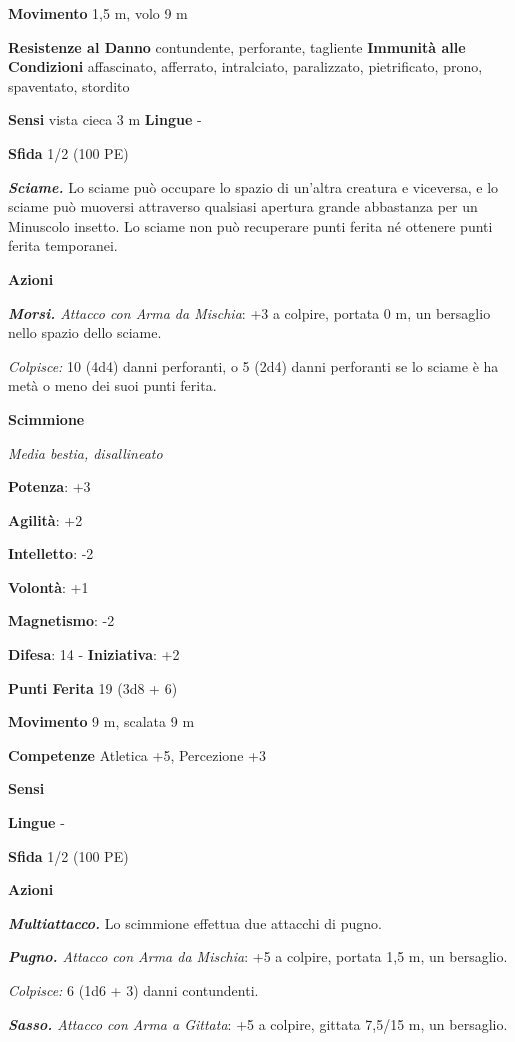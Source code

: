 \begin{multicols}{2}
\textbf{Movimento} 1,5 m, volo 9 m

\textbf{Resistenze al Danno} contundente, perforante, tagliente
\textbf{Immunità alle Condizioni} affascinato, afferrato, intralciato,
paralizzato, pietrificato, prono, spaventato, stordito

\textbf{Sensi} vista cieca 3 m \textbf{Lingue} -

\textbf{Sfida} 1/2 (100 PE)

\emph{\textbf{Sciame.}} Lo sciame può occupare lo spazio di un'altra
creatura e viceversa, e lo sciame può muoversi attraverso qualsiasi
apertura grande abbastanza per un Minuscolo insetto. Lo sciame non può
recuperare punti ferita né ottenere punti ferita temporanei.

\textbf{Azioni}

\emph{\textbf{Morsi.} Attacco con Arma da Mischia}: +3 a colpire,
portata 0 m, un bersaglio nello spazio dello sciame.

\emph{Colpisce:} 10 (4d4) danni perforanti, o 5 (2d4) danni perforanti
se lo sciame è ha metà o meno dei suoi punti ferita.

\textbf{Scimmione}

\emph{Media bestia, disallineato}

\textbf{Potenza}: +3

\textbf{Agilità}: +2

\textbf{Intelletto}: -2

\textbf{Volontà}: +1

\textbf{Magnetismo}: -2

\textbf{Difesa}: 14 - \textbf{Iniziativa}: +2

\textbf{Punti Ferita} 19 (3d8 + 6)

\textbf{Movimento} 9 m, scalata 9 m

\textbf{Competenze} Atletica +5, Percezione +3

\textbf{Sensi} 

\textbf{Lingue} -

\textbf{Sfida} 1/2 (100 PE)

\textbf{Azioni}

\emph{\textbf{Multiattacco.}} Lo scimmione effettua due attacchi di
pugno.

\emph{\textbf{Pugno.} Attacco con Arma da Mischia}: +5 a colpire,
portata 1,5 m, un bersaglio.

\emph{Colpisce:} 6 (1d6 + 3) danni contundenti.

\emph{\textbf{Sasso.} Attacco con Arma a Gittata}: +5 a colpire, gittata
7,5/15 m, un bersaglio.


\end{multicols}
